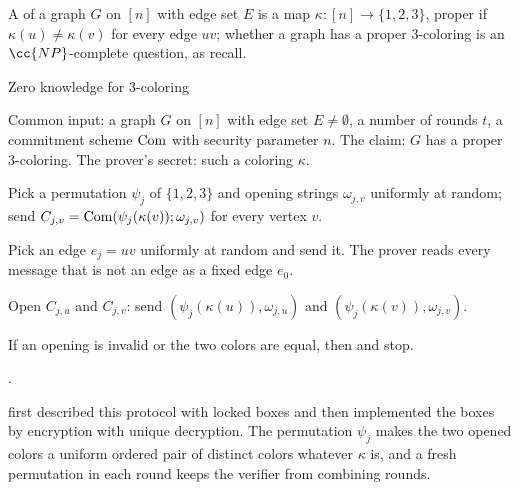 \begin{refsection}
A  of a graph $G$ on $[n]$ with edge set $E$ is a map $\kappa\colon[n]\to\{1,2,3\}$, proper if $\kappa(u)\ne\kappa(v)$ for every edge $uv$; whether a graph has a proper 3-coloring is an $\cc{NP}$-complete question, as \textcite{GoldreichMicaliWigderson1991} recall.

\begin{protocol}{Zero knowledge for 3-coloring}\label{prot:zeroknowledge:coloring}
\item[\act{V}] Common input: a graph $G$ on $[n]$ with edge set $E\ne\emptyset$, a number of rounds $t$, a commitment scheme $\mathrm{Com}$ with security parameter $n$. The claim: $G$ has a proper 3-coloring. The prover's secret: such a coloring $\kappa$.
\item[\msg{P}{V}] Pick a permutation $\psi_j$ of $\{1,2,3\}$ and opening strings $\omega_{j,v}$ uniformly at random; send $C_{j,v}=\mathrm{Com}(\psi_j(\kappa(v));\omega_{j,v})$ for every vertex $v$.
\item[\msg{V}{P}] Pick an edge $e_j=uv$ uniformly at random and send it. The prover reads every message that is not an edge as a fixed edge $e_0$.
\item[\msg{P}{V}] Open $C_{j,u}$ and $C_{j,v}$: send $(\psi_j(\kappa(u)),\omega_{j,u})$ and $(\psi_j(\kappa(v)),\omega_{j,v})$.
\item[\act{V}] If an opening is invalid or the two colors are equal, then \rej{} and stop.
\item[\act{V}] \acc.
\end{protocol}

\textcite{GoldreichMicaliWigderson1991} first described this protocol with locked boxes and then implemented the boxes by encryption with unique decryption. The permutation $\psi_j$ makes the two opened colors a uniform ordered pair of distinct colors whatever $\kappa$ is, and a fresh permutation in each round keeps the verifier from combining rounds.


\end{refsection}
